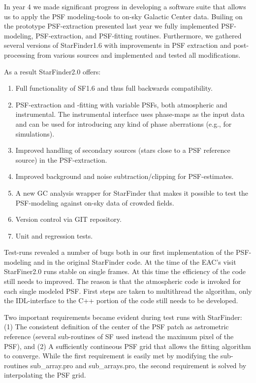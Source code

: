 In year 4 we made significant progress in developing a software suite that allows us to apply the PSF modeling-tools to on-sky Galactic Center data. Builing on the prototype PSF-extraction presented last year we fully implemented PSF-modeling, PSF-extraction, and PSF-fitting routines. Furthermore, we gathered several versions of StarFinder1.6 with improvements in PSF extraction and post-processing from various sources and implemented and tested all modifications.

As a result StarFinder2.0 offers:
\begin{enumerate}
\item Full functionality of SF1.6 and thus full backwards compatibility.
\item PSF-extraction and -fitting with variable PSFs, both atmospheric and instrumental. The instrumental interface uses phase-maps as the input data and can be used for introducing any kind of phase aberrations (e.g., for simulations).
\item Improved handling of secondary sources (stars close to a PSF reference source) in the PSF-extraction.
\item Improved background and noise subtraction/clipping for PSF-estimates.
\item A new GC analysis wrapper for StarFinder that makes it possible to test the PSF-modeling against on-sky data of crowded fields.
\item Version control via GIT repository.
\item Unit and regression tests.
\end{enumerate}
  
Test-runs revealed a number of bugs both in our first implementation of the PSF-modeling and in the original StarFinder code. At the time of the EAC's visit StarFiner2.0 runs stable on single frames. At this time the efficiency of the code still needs to improved. The reason is that the atmospheric code is invoked for each single modeled PSF. First steps are taken to multithread the algorithm, only the IDL-interface to the C++ portion of the code still needs to be developed.

Two important requirements became evident during test runs with StarFinder: (1) The consistent definition of the center of the PSF patch as astrometric reference (several sub-routines of SF used instead the maximum pixel of the PSF), and (2) A sufficiently contineous PSF grid that allows the fitting algorithm to converge. While the first requirement is easily met by modifying the sub-routines sub\_array.pro and sub\_arrays.pro, the second requirement is solved by interpolating the PSF grid. 
  
  
  
  